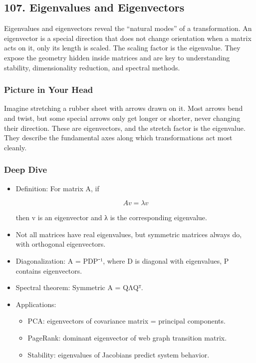 \documentclass[
  letterpaper,
  DIV=11,
  numbers=noendperiod]{scrreprt}
\providecommand{\tightlist}{%
  \setlength{\itemsep}{0pt}\setlength{\parskip}{0pt}}
\begin{document}
\subsection{107. Eigenvalues and
Eigenvectors}\label{eigenvalues-and-eigenvectors}

Eigenvalues and eigenvectors reveal the ``natural modes'' of a
transformation. An eigenvector is a special direction that does not
change orientation when a matrix acts on it, only its length is scaled.
The scaling factor is the eigenvalue. They expose the geometry hidden
inside matrices and are key to understanding stability, dimensionality
reduction, and spectral methods.

\subsubsection{Picture in Your Head}\label{picture-in-your-head-106}

Imagine stretching a rubber sheet with arrows drawn on it. Most arrows
bend and twist, but some special arrows only get longer or shorter,
never changing their direction. These are eigenvectors, and the stretch
factor is the eigenvalue. They describe the fundamental axes along which
transformations act most cleanly.

\subsubsection{Deep Dive}\label{deep-dive-106}

\begin{itemize}
\item
  Definition: For matrix A, if

  \[
  A v = \lambda v
  \]

  then v is an eigenvector and λ is the corresponding eigenvalue.
\item
  Not all matrices have real eigenvalues, but symmetric matrices always
  do, with orthogonal eigenvectors.
\item
  Diagonalization: A = PDP⁻¹, where D is diagonal with eigenvalues, P
  contains eigenvectors.
\item
  Spectral theorem: Symmetric A = QΛQᵀ.
\item
  Applications:

  \begin{itemize}
  \tightlist
  \item
    PCA: eigenvectors of covariance matrix = principal components.
  \item
    PageRank: dominant eigenvector of web graph transition matrix.
  \item
    Stability: eigenvalues of Jacobians predict system behavior.
  \end{itemize}
\end{itemize}
\end{document}
